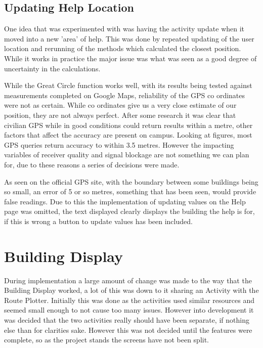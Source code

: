 \subsection{Updating Help Location}
One idea that was experimented with was having the activity update when it moved into a new 'area' of help. This was done by repeated updating of the user location and rerunning of the methods which calculated the closest position. While it works in practice the major issue was what was seen as a good degree of uncertainty in the calculations.

While the Great Circle function works well, with its results being tested against measurements completed on Google Maps, reliability of the GPS co ordinates were not as certain. While co ordinates give us a very close estimate of our position, they are not always perfect. After some research it was clear that civilian GPS while in good conditions could return results within a metre\cite{gps}, other factors that affect the accuracy are present on campus. Looking at figures, most GPS queries return accuracy to within 3.5 metres\cite{accuracy}. However the impacting variables of receiver quality and signal blockage are not something we can plan for, due to these reasons a series of decisions were made.

As seen on the official GPS site\cite{gps}, with the boundary between some buildings being so small, an error of 5 or so metres, something that has been seen, would provide false readings. Due to this the implementation of updating values on the Help page was omitted, the text displayed clearly displays the building the help is for, if this is wrong  a button to update values has been included.  

\section{Building Display}
During implementation a large amount of change was made to the way that the Building Display worked, a lot of this was down to it sharing an Activity with the Route Plotter. Initially this was done as the activities used similar resources and seemed small enough to not cause too many issues. However into development it was decided that the two activities really should have been separate, if nothing else than for clarities sake. However this was not decided until the features were complete, so as the project stands the screens have not been split. 
